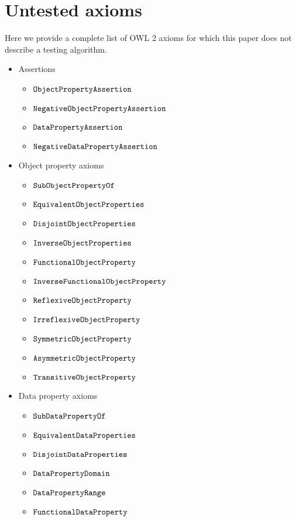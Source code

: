 \documentclass[paper.tex]{subfiles}
\begin{document}
\section{Untested axioms}
\label{app:untested}

Here we provide a complete list of OWL 2 axioms for which this paper does not describe a testing algorithm.

\begin{itemize}
  \item Assertions
  \begin{itemize}[noitemsep]
    \item $\mathtt{ObjectPropertyAssertion}$
    \item $\mathtt{NegativeObjectPropertyAssertion}$
    \item $\mathtt{DataPropertyAssertion}$
    \item $\mathtt{NegativeDataPropertyAssertion}$
  \end{itemize}

  \item Object property axioms
  \begin{itemize}[noitemsep]
    \item $\mathtt{SubObjectPropertyOf}$
    \item $\mathtt{EquivalentObjectProperties}$
    \item $\mathtt{DisjointObjectProperties}$
    \item $\mathtt{InverseObjectProperties}$
    \item $\mathtt{FunctionalObjectProperty}$
    \item $\mathtt{InverseFunctionalObjectProperty}$
    \item $\mathtt{ReflexiveObjectProperty}$
    \item $\mathtt{IrreflexiveObjectProperty}$
    \item $\mathtt{SymmetricObjectProperty}$
    \item $\mathtt{AsymmetricObjectProperty}$
    \item $\mathtt{TransitiveObjectProperty}$
  \end{itemize}

  \item Data property axioms
  \begin{itemize}[noitemsep]
    \item $\mathtt{SubDataPropertyOf}$
    \item $\mathtt{EquivalentDataProperties}$
    \item $\mathtt{DisjointDataProperties}$
    \item $\mathtt{DataPropertyDomain}$
    \item $\mathtt{DataPropertyRange}$
    \item $\mathtt{FunctionalDataProperty}$
  \end{itemize}


\end{itemize}
\end{document}

